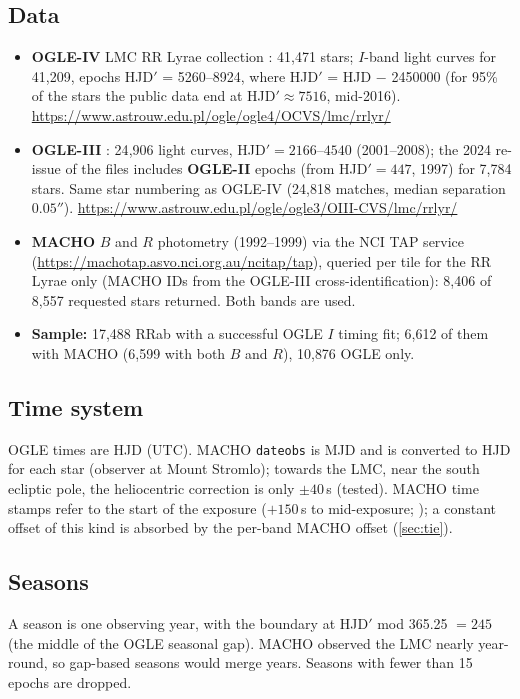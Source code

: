 \documentclass[11pt]{article}
\begin{document}
\subsection{Data}
\begin{itemize}[leftmargin=*]
\item \textbf{OGLE-IV} LMC RR Lyrae collection \citep{Soszynski2016}: 41{,}471 stars; $I$-band light curves for 41{,}209,
epochs HJD$'$ = 5260--8924, where HJD$'$ = HJD $-$ 2450000 (for 95\% of the stars the public data end at HJD$'\approx7516$, mid-2016).
\url{https://www.astrouw.edu.pl/ogle/ogle4/OCVS/lmc/rrlyr/}
\item \textbf{OGLE-III} \citep{Soszynski2009}: 24{,}906 light curves, HJD$'=2166$--$4540$ (2001--2008); the 2024
re-issue of the files includes \textbf{OGLE-II} epochs (from HJD$'=447$, 1997) for 7{,}784 stars.
Same star numbering as OGLE-IV (24{,}818 matches, median separation $0.05''$).
\url{https://www.astrouw.edu.pl/ogle/ogle3/OIII-CVS/lmc/rrlyr/}
\item \textbf{MACHO} $B$ and $R$ photometry (1992--1999) via the NCI TAP service
(\url{https://machotap.asvo.nci.org.au/ncitap/tap}), queried per tile for the RR Lyrae only (MACHO IDs from the
OGLE-III cross-identification): 8{,}406 of 8{,}557 requested stars returned. Both bands are used.
\item \textbf{Sample:} 17{,}488 RRab with a successful OGLE $I$ timing fit; 6{,}612 of them with MACHO
(6{,}599 with both $B$ and $R$), 10{,}876 OGLE only.
\end{itemize}

\subsection{Time system}
OGLE times are HJD (UTC). MACHO \texttt{dateobs} is MJD and is converted to HJD for each star (observer at Mount
Stromlo); towards the LMC, near the south ecliptic pole, the heliocentric correction is only $\pm40$\,s
(tested). MACHO time stamps refer to the start of the exposure ($+150$\,s to mid-exposure; \citealt{Michalska2005}); a constant offset of this kind is absorbed by the per-band
MACHO offset (\cref{sec:tie}).

\subsection{Seasons}
A season is one observing year, with the boundary at HJD$'$ mod 365.25 $=245$ (the middle of the OGLE seasonal gap).
MACHO observed the LMC nearly year-round, so gap-based seasons would merge years. Seasons with fewer than 15 epochs are dropped.
\end{document}

